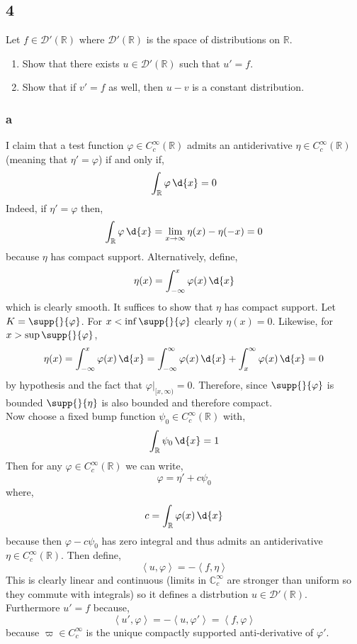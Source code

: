 \documentclass[12pt]{article}
\newcommand{\inner}[2]{\left< #1, #2 \right>}
\newcommand{\R}{\mathbb{R}}
\renewcommand{\C}{\mathbb{C}}
\renewcommand{\D}{\mathcal{D}}
\begin{document}
\subsection{4}

\begin{exercise}
Let $f \in \D'(\R)$ where $\D'(\R)$ is the space of distributions on $\R$.
\begin{enumerate}
\item Show that there exists $u \in \D'(\R)$ such that $u' = f$.
\item Show that if $v' = f$ as well, then $u - v$ is a constant distribution.
\end{enumerate}
\end{exercise}

\subsubsection{a}

I claim that a test function $\varphi \in C^\infty_c(\R)$ admits an antiderivative $\eta \in C^\infty_c(\R)$ (meaning that $\eta' = \varphi$) if and only if,
\[ \int_\R \varphi \, \d{x} = 0 \]
Indeed, if $\eta' = \varphi$ then,
\[ \int_\R \varphi \, \d{x} = \lim_{x \to \infty} \eta(x) - \eta(-x) = 0 \]
because $\eta$ has compact support. Alternatively, define,
\[ \eta(x) = \int_{-\infty}^x \varphi(x) \, \d{x} \]
which is clearly smooth. It suffices to show that $\eta$ has compact support. Let $K = \supp{}{\varphi}$. For $x < \inf \supp{}{\varphi}$ clearly $\eta(x) = 0$. Likewise, for $x > \sup \supp{}{\varphi}$,
\[ \eta(x) = \int_{-\infty}^x \varphi(x) \, \d{x} = \int_{-\infty}^{\infty} \varphi(x) \, \d{x} + \int_{x}^\infty \varphi(x) \, \d{x} = 0 \]
by hypothesis and the fact that $\varphi|_{[x, \infty)} = 0$. Therefore, since $\supp{}{\varphi}$ is bounded $\supp{}{\eta}$ is also bounded and therefore compact.
\bigskip\\
Now choose a fixed bump function $\psi_0 \in C^\infty_c(\R)$ with,
\[ \int_\R \psi_0 \, \d{x} = 1 \]
Then for any $\varphi \in C_c^\infty(\R)$ we can write,
\[ \varphi = \eta' + c \psi_0 \]
where,
\[ c = \int_\R \varphi(x) \, \d{x} \]
because then $\varphi - c \psi_0$ has zero integral and thus admits an antiderivative $\eta \in C^\infty_c(\R)$. Then define,
\[ \inner{u}{\varphi} = - \inner{f}{\eta} \]
This is clearly linear and continuous (limits in $\C_c^\infty$ are stronger than uniform so they commute with integrals) so it defines a distrbution $u \in \D'(\R)$. Furthermore $u' = f$ because,
\[ \inner{u'}{\varphi} = - \inner{u}{\varphi'} = \inner{f}{\varphi} \]
because $\varpi \in C^\infty_c$ is the unique compactly supported anti-derivative of $\varphi'$. 
\end{document}
